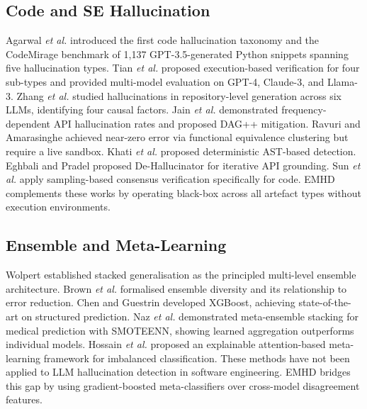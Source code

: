 \documentclass{svproc}
\newcommand{\method}{\textsc{EMHD}}
\newcommand{\etal}{\textit{et al.}}
\begin{document}
\subsection{Code and SE Hallucination}

Agarwal \etal \cite{agarwal2025codemirage} introduced the first code hallucination taxonomy and the CodeMirage benchmark of 1,137 GPT-3.5-generated Python snippets spanning five hallucination types. Tian \etal \cite{tian2025codehalu} proposed execution-based verification for four sub-types and provided multi-model evaluation on GPT-4, Claude-3, and Llama-3. Zhang \etal \cite{zhang2025llmhallucinations} studied hallucinations in repository-level generation across six LLMs, identifying four causal factors. Jain \etal \cite{jain2025codeapi} demonstrated frequency-dependent API hallucination rates and proposed DAG++ mitigation. Ravuri and Amarasinghe \cite{ravuri2025clustering} achieved near-zero error via functional equivalence clustering but require a live sandbox. Khati \etal \cite{khati2026ast} proposed deterministic AST-based detection. Eghbali and Pradel \cite{eghbali2024dehallucinator} proposed De-Hallucinator for iterative API grounding. Sun \etal \cite{sun2025sampling} apply sampling-based consensus verification specifically for code. \method{} complements these works by operating black-box across all artefact types without execution environments.

\subsection{Ensemble and Meta-Learning}

Wolpert \cite{wolpert1992stacking} established stacked generalisation as the principled multi-level ensemble architecture. Brown \etal \cite{brown2005diversity} formalised ensemble diversity and its relationship to error reduction. Chen and Guestrin \cite{chen2016xgboost} developed XGBoost, achieving state-of-the-art on structured prediction. Naz \etal \cite{naz2025metaensemble} demonstrated meta-ensemble stacking for medical prediction with SMOTEENN, showing learned aggregation outperforms individual models. Hossain \etal \cite{hossain2025attention} proposed an explainable attention-based meta-learning framework for imbalanced classification. These methods have not been applied to LLM hallucination detection in software engineering. \method{} bridges this gap by using gradient-boosted meta-classifiers over cross-model disagreement features.

\end{document}

